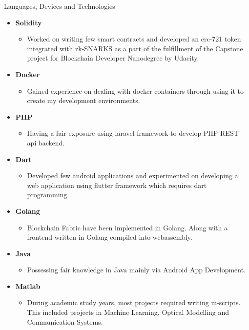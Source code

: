 \documentclass[]{mcdowellcv}
\begin{document}
\begin{cvsection}{Languages, Devices and Technologies}
\begin{cvsubsection}{}{}{}
\begin{itemize}
				\item \textbf{Solidity}
				\begin{itemize}
					\item Worked on writing few smart contracts and developed an erc-721 token integrated with zk-SNARKS as a part of the fulfillment of the Capstone project for Blockchain Developer Nanodegree by Udacity.
				\end{itemize}
				\item \textbf{Docker}
				\begin{itemize}
					\item Gained experience on dealing with docker containers through using it to create my development environments. 
				\end{itemize}
				\item \textbf{PHP}
				\begin{itemize}
					\item Having a fair exposure using laravel framework to develop PHP REST-api backend.
				\end{itemize}
				\item \textbf{Dart}
				\begin{itemize}
					\item Developed few android applications and experimented on developing a web application using flutter framework which requires dart programming.
                                     \end{itemize}
                                     \item \textbf{Golang}
				\begin{itemize}
					\item Blockchain Fabric have been implemented in Golang. Along with a frontend written in Golang compiled into webassembly.
				\end{itemize}
                                     \item \textbf{Java}
				\begin{itemize}
					\item Possessing fair knowledge in Java mainly via Android App Development.
				\end{itemize}
                                     \item \textbf{Matlab}
				\begin{itemize}
					\item During academic study years, most projects required writing m-scripts. This included projects in Machine Learning, Optical Modelling and Communication Systems.
				\end{itemize}

\end{itemize}
\end{cvsubsection}
\end{cvsection}
\end{document}

